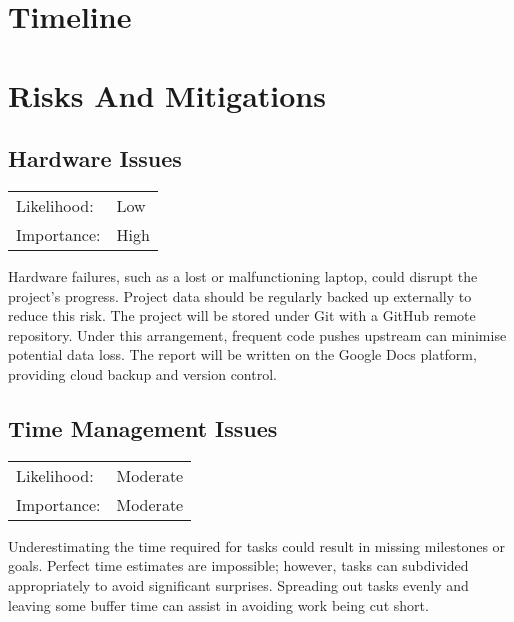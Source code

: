 \documentclass[]{final_report}
\begin{document}

\chapter{Timeline}

\chapter{Risks And Mitigations}

\section{Hardware Issues}

\begin{center}
    \begin{tabular}{l l}
    Likelihood: & Low \\
    Importance: & High \\
    \end{tabular}
  \end{center}

Hardware failures, such as a lost or malfunctioning laptop, could disrupt the project's progress. Project data should be regularly backed up externally to reduce this risk. The project will be stored under Git with a GitHub remote repository. Under this arrangement, frequent code pushes upstream can minimise potential data loss. The report will be written on the Google Docs platform, providing cloud backup and version control.


\section{Time Management Issues}

\begin{center}
    \begin{tabular}{l l  }
    Likelihood: & Moderate \\
    Importance: & Moderate \\
    \end{tabular}
  \end{center}

Underestimating the time required for tasks could result in missing milestones or goals. Perfect time estimates are impossible; however, tasks can subdivided appropriately to avoid significant surprises. Spreading out tasks evenly and leaving some buffer time can assist in avoiding work being cut short. 
\end{document}
